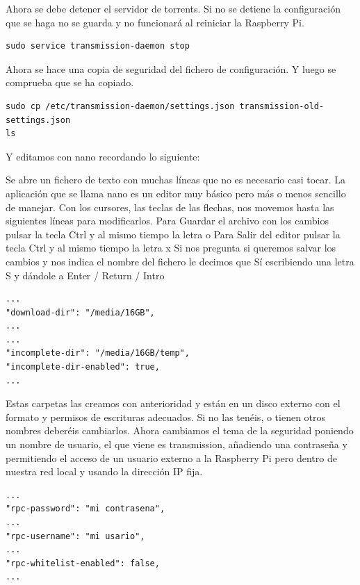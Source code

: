 \documentclass{article}
\begin{document}
Ahora se debe detener el servidor de torrents. Si no se detiene la configuración que se haga no se guarda y no funcionará al reiniciar la Raspberry Pi.

\begin{verbatim}
sudo service transmission-daemon stop
\end{verbatim}

Ahora se hace una copia de seguridad del fichero de configuración. Y luego se comprueba que se ha copiado.

\begin{verbatim}
sudo cp /etc/transmission-daemon/settings.json transmission-old-settings.json
ls
\end{verbatim}

Y editamos con nano recordando lo siguiente:

Se abre un fichero de texto con muchas líneas que no es necesario casi tocar. La aplicación que se llama nano es un editor muy básico pero más o menos sencillo de manejar. Con los cursores, las teclas de las flechas, nos movemos hasta las siguientes líneas para modificarlos.
Para Guardar el archivo con los cambios pulsar la tecla Ctrl y al mismo tiempo la letra o
Para Salir del editor pulsar la tecla Ctrl y al mismo tiempo la letra x
Si nos pregunta si queremos salvar los cambios y nos indica el nombre del fichero le decimos que Sí escribiendo una letra S y dándole a Enter / Return / Intro

\begin{verbatim}
...
"download-dir": "/media/16GB",
...
...
"incomplete-dir": "/media/16GB/temp",
"incomplete-dir-enabled": true,
...
\end{verbatim}

Estas carpetas las creamos con anterioridad y están en un disco externo con el formato y permisos de escrituras adecuados. Si no las tenéis, o tienen otros nombres deberéis cambiarlos. Ahora cambiamos el tema de la seguridad poniendo un nombre de usuario, el que viene es transmission, añadiendo una contraseña y permitiendo el acceso de un usuario externo a la Raspberry Pi pero dentro de nuestra red local y usando la dirección IP fija.

\begin{verbatim}
...
"rpc-password": "mi contrasena",
...
"rpc-username": "mi usario",
...
"rpc-whitelist-enabled": false,
...
\end{verbatim}
\end{document}
